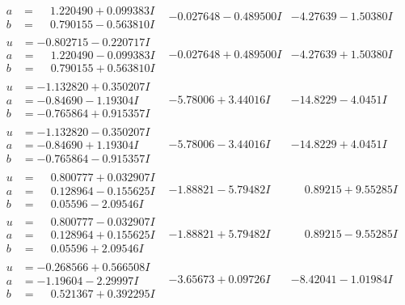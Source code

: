 \documentclass[1p]{elsarticle_modified}
\theoremstyle{definition}
\begin{document}
$$\begin{array}{c|c|c}
\begin{aligned}
a &= \phantom{-}1.220490 + 0.099383 I \\
b &= \phantom{-}0.790155 - 0.563810 I\end{aligned}
 & -0.027648 - 0.489500 I & -4.27639 - 1.50380 I \\ \hline\begin{aligned}
u &= -0.802715 - 0.220717 I \\
a &= \phantom{-}1.220490 - 0.099383 I \\
b &= \phantom{-}0.790155 + 0.563810 I\end{aligned}
 & -0.027648 + 0.489500 I & -4.27639 + 1.50380 I \\ \hline\begin{aligned}
u &= -1.132820 + 0.350207 I \\
a &= -0.84690 - 1.19304 I \\
b &= -0.765864 + 0.915357 I\end{aligned}
 & -5.78006 + 3.44016 I & -14.8229 - 4.0451 I \\ \hline\begin{aligned}
u &= -1.132820 - 0.350207 I \\
a &= -0.84690 + 1.19304 I \\
b &= -0.765864 - 0.915357 I\end{aligned}
 & -5.78006 - 3.44016 I & -14.8229 + 4.0451 I \\ \hline\begin{aligned}
u &= \phantom{-}0.800777 + 0.032907 I \\
a &= \phantom{-}0.128964 - 0.155625 I \\
b &= \phantom{-}0.05596 - 2.09546 I\end{aligned}
 & -1.88821 - 5.79482 I & \phantom{-}0.89215 + 9.55285 I \\ \hline\begin{aligned}
u &= \phantom{-}0.800777 - 0.032907 I \\
a &= \phantom{-}0.128964 + 0.155625 I \\
b &= \phantom{-}0.05596 + 2.09546 I\end{aligned}
 & -1.88821 + 5.79482 I & \phantom{-}0.89215 - 9.55285 I \\ \hline\begin{aligned}
u &= -0.268566 + 0.566508 I \\
a &= -1.19604 - 2.29997 I \\
b &= \phantom{-}0.521367 + 0.392295 I\end{aligned}
 & -3.65673 + 0.09726 I & -8.42041 - 1.01984 I \\ \hline\begin{aligned}

\end{aligned}
\end{array}$$
\end{document}
